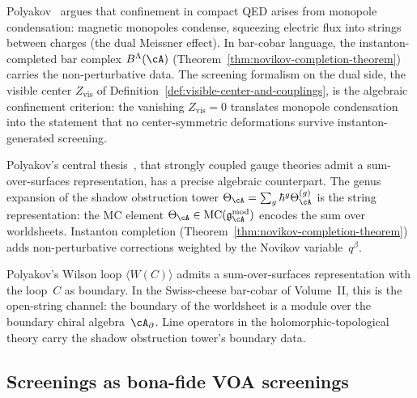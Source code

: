 \begin{remark}
\label{rem:polyakov-confinement-algebraized}
Polyakov~\cite{Pol87} argues that confinement in compact QED arises from monopole condensation: magnetic monopoles condense, squeezing electric flux into strings between charges (the dual Meissner effect). In bar-cobar language, the instanton-completed bar complex $B^\Lambda(\cA)$ (Theorem~\ref{thm:novikov-completion-theorem}) carries the non-perturbative data. The screening formalism on the dual side, the visible center $Z_{\mathrm{vis}}$ of Definition~\ref{def:visible-center-and-couplings}, is the algebraic confinement criterion: the vanishing $Z_{\mathrm{vis}} = 0$ translates monopole condensation into the statement that no center-symmetric deformations survive instanton-generated screening.
\end{remark}

\begin{remark}
\label{rem:gauge-string-shadow-tower}
Polyakov's central thesis~\cite{Pol87}, that strongly coupled gauge theories admit a sum-over-surfaces representation, has a precise algebraic counterpart. The genus expansion of the shadow obstruction tower $\Theta_\cA = \sum_g \hbar^g \Theta_\cA^{(g)}$ is the string representation: the MC element $\Theta_\cA \in \mathrm{MC}(\mathfrak{g}^{\mathrm{mod}}_\cA)$ encodes the sum over worldsheets. Instanton completion (Theorem~\ref{thm:novikov-completion-theorem}) adds non-perturbative corrections weighted by the Novikov variable~$q^\beta$.
\end{remark}

\begin{remark}
\label{rem:wilson-loop-boundary}
Polyakov's Wilson loop $\langle W(C) \rangle$ admits a sum-over-surfaces representation with the loop~$C$ as boundary. In the Swiss-cheese bar-cobar of Volume~II, this is the open-string channel: the boundary of the worldsheet is a module over the boundary chiral algebra~$\cA_{\partial}$. Line operators in the holomorphic-topological theory carry the shadow obstruction tower's boundary data.
\end{remark}


\subsection{Screenings as bona-fide VOA screenings}
\label{subsec:ym-screenings-wakimoto}

